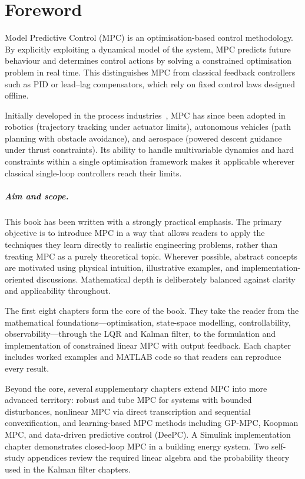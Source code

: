 \chapter*{Foreword}

Model Predictive Control (MPC) is an optimisation-based control methodology. By explicitly exploiting a dynamical model of the system, MPC predicts future behaviour and determines control actions by solving a constrained optimisation problem in real time. This distinguishes MPC from classical feedback controllers such as PID or lead--lag compensators, which rely on fixed control laws designed offline.

Initially developed in the process industries~\cite{Qin2003}, MPC has since been adopted in robotics (trajectory tracking under actuator limits), autonomous vehicles (path planning with obstacle avoidance), and aerospace (powered descent guidance under thrust constraints). Its ability to handle multivariable dynamics and hard constraints within a single optimisation framework makes it applicable wherever classical single-loop controllers reach their limits.

\paragraph{Aim and scope.}
This book has been written with a strongly practical emphasis. The primary objective is to introduce MPC in a way that allows readers to apply the techniques they learn directly to realistic engineering problems, rather than treating MPC as a purely theoretical topic. Wherever possible, abstract concepts are motivated using physical intuition, illustrative examples, and implementation-oriented discussions. Mathematical depth is deliberately balanced against clarity and applicability throughout.

The first eight chapters form the core of the book. They take the reader from the mathematical foundations---optimisation, state-space modelling, controllability, observability---through the LQR and Kalman filter, to the formulation and implementation of constrained linear MPC with output feedback. Each chapter includes worked examples and MATLAB code so that readers can reproduce every result.

Beyond the core, several supplementary chapters extend MPC into more advanced territory: robust and tube MPC for systems with bounded disturbances, nonlinear MPC via direct transcription and sequential convexification, and learning-based MPC methods including GP-MPC, Koopman MPC, and data-driven predictive control (DeePC). A Simulink implementation chapter demonstrates closed-loop MPC in a building energy system. Two self-study appendices review the required linear algebra and the probability theory used in the Kalman filter chapters.

